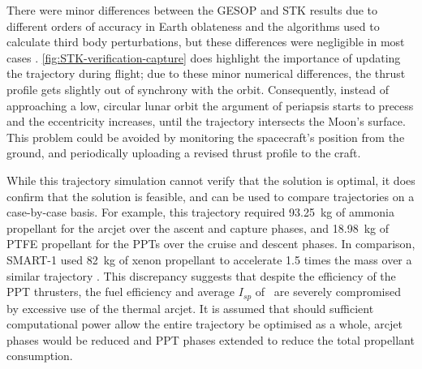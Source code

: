 There were minor differences %
between the GESOP and STK results due to different orders of accuracy in Earth oblateness and the algorithms used to calculate third body perturbations, but these differences were negligible in most cases%
. \autoref{fig:STK-verification-capture} does highlight the importance of updating the trajectory during flight; due to these minor numerical differences, the thrust profile gets slightly out of synchrony with the orbit. Consequently, instead of approaching a low, circular lunar orbit the argument of periapsis starts to precess and the eccentricity increases, until the trajectory intersects the Moon's surface. This problem could be avoided by monitoring the spacecraft's position from the ground, and periodically uploading a revised thrust profile to the craft.

%

While this trajectory simulation cannot verify that the solution is optimal, it does confirm that the solution is feasible, and can be used to compare trajectories on a case-by-case basis. For example, this trajectory required 93.25~kg of ammonia propellant for the arcjet over the ascent and capture phases, and 18.98~kg of PTFE propellant for the PPTs over the cruise and descent phases. In comparison, SMART-1 used 82~kg of xenon propellant to accelerate 1.5 times the mass over a similar trajectory \parencite{Estublier2007}. This discrepancy suggests that despite the efficiency of the PPT thrusters, the fuel efficiency and average $I_{sp}$ of \BW\ are severely compromised by excessive use of the thermal arcjet. It is assumed that should sufficient computational power allow the entire trajectory be optimised as a whole, arcjet phases would be reduced and PPT phases extended to reduce the total propellant consumption.


